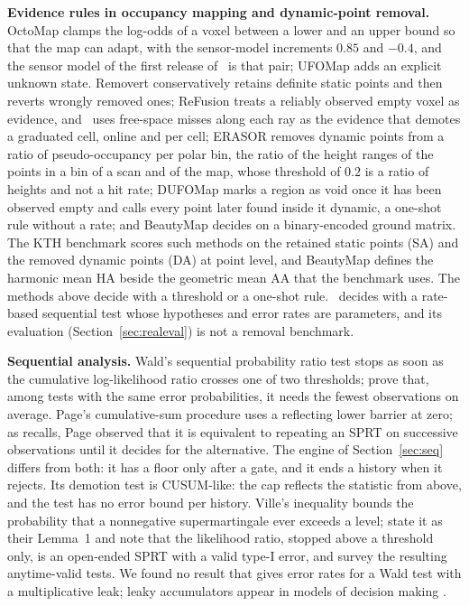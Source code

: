 \noindent\textbf{Evidence rules in occupancy mapping and dynamic-point removal.} OctoMap \citep{hornung2013octomap} clamps the log-odds of a voxel between a lower and an upper bound so that the map can adapt, with the sensor-model increments $0.85$ and $-0.4$, and the sensor model of the first release of \sname\ is that pair; UFOMap \citep{duberg2020ufomap} adds an explicit unknown state. Removert \citep{kim2020removert} conservatively retains definite static points and then reverts wrongly removed ones; ReFusion \citep{palazzolo2019refusion} treats a reliably observed empty voxel as evidence, and \sname\ uses free-space misses along each ray as the evidence that demotes a graduated cell, online and per cell; ERASOR \citep{lim2021erasor} removes dynamic points from a ratio of pseudo-occupancy per polar bin, the ratio of the height ranges of the points in a bin of a scan and of the map, whose threshold of $0.2$ is a ratio of heights and not a hit rate; DUFOMap \citep{duberg2024dufomap} marks a region as void once it has been observed empty and calls every point later found inside it dynamic, a one-shot rule without a rate; and BeautyMap \citep{jia2024beautymap} decides on a binary-encoded ground matrix. The KTH benchmark \citep{zhang2023dynamic} scores such methods on the retained static points (SA) and the removed dynamic points (DA) at point level, and BeautyMap defines the harmonic mean HA beside the geometric mean AA that the benchmark uses. The methods above decide with a threshold or a one-shot rule. \sname\ decides with a rate-based sequential test whose hypotheses and error rates are parameters, and its evaluation (Section~\ref{sec:realeval}) is not a removal benchmark.

\noindent\textbf{Sequential analysis.} Wald's sequential probability ratio test \citep{wald1947sequential} stops as soon as the cumulative log-likelihood ratio crosses one of two thresholds; \citet{wald1948optimum} prove that, among tests with the same error probabilities, it needs the fewest observations on average. Page's cumulative-sum procedure \citep{page1954continuous} uses a reflecting lower barrier at zero; as \citet{lorden1971procedures} recalls, Page observed that it is equivalent to repeating an SPRT on successive observations until it decides for the alternative. The engine of Section~\ref{sec:seq} differs from both: it has a floor only after a gate, and it ends a history when it rejects. Its demotion test is CUSUM-like: the cap reflects the statistic from above, and the test has no error bound per history. Ville's inequality bounds the probability that a nonnegative supermartingale ever exceeds a level; \citet{howard2020timeuniform} state it as their Lemma~1 and note that the likelihood ratio, stopped above a threshold only, is an open-ended SPRT with a valid type-I error, and \citet{ramdas2023game} survey the resulting anytime-valid tests. We found no result that gives error rates for a Wald test with a multiplicative leak; leaky accumulators appear in models of decision making \citep{bogacz2006physics}.

